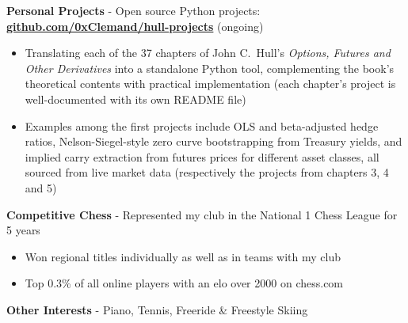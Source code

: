 \documentclass[11pt, a4paper]{article}
\begin{document}
\noindent\textbf{Personal Projects} - Open source Python projects: \href{https://github.com/0xClemand/hull-projects}{\textbf{github.com/0xClemand/hull-projects}}
\textcolor{muted}{(ongoing)}
\begin{itemize}
  \item Translating each of the 37 chapters of John C.\ Hull's \textit{Options, Futures and
        Other Derivatives} into a standalone Python tool, complementing the book's theoretical contents with practical implementation (each chapter's project is well-documented with its own README file)
  \item Examples among the first projects include OLS and beta-adjusted hedge ratios,
        Nelson-Siegel-style zero curve bootstrapping from Treasury yields, and implied carry extraction from futures prices for different asset classes, all sourced from live market data (respectively the projects from chapters 3, 4
        and 5)
\end{itemize}

\smallskip
\noindent\textbf{Competitive Chess} - Represented my club in the National 1 Chess League for
5 years
\begin{itemize}
  \item Won regional titles individually as well as in teams with my club
  \item Top 0.3\% of all online players with an elo over 2000 on chess.com
\end{itemize}

\smallskip
\noindent\textbf{Other Interests} - Piano, Tennis, Freeride \& Freestyle Skiing
\end{document}
